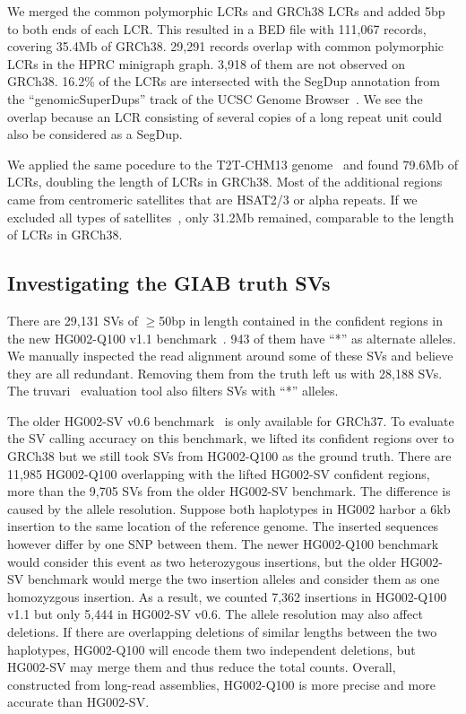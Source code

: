 \documentclass[a4paper,num-refs]{oup-contemporary}
\begin{document}
We merged the common polymorphic LCRs and GRCh38 LCRs and added 5bp to both ends of each LCR.
This resulted in a BED file with 111,067 records, covering 35.4Mb of GRCh38.
29,291 records overlap with common polymorphic LCRs in the HPRC minigraph graph.
3,918 of them are not observed on GRCh38.
16.2\% of the LCRs are intersected with the SegDup annotation from the ``genomicSuperDups'' track of the UCSC Genome Browser~\cite{Perez:2025aa}.
We see the overlap because an LCR consisting of several copies of a long repeat unit could also be considered as a SegDup.

We applied the same pocedure to the T2T-CHM13 genome~\cite{Nurk:2022up}
and found 79.6Mb of LCRs, doubling the length of LCRs in GRCh38.
Most of the additional regions came from centromeric satellites that are HSAT2/3 or alpha repeats.
If we excluded all types of satellites~\cite{Altemose:2022tv}, only 31.2Mb remained,
comparable to the length of LCRs in GRCh38.

\subsection{Investigating the GIAB truth SVs}

There are 29,131 SVs of $\ge$50bp in length contained in the confident regions in the new HG002-Q100 v1.1 benchmark~\cite{Hansen2025.09.21.677443}.
943 of them have ``*'' as alternate alleles.
We manually inspected the read alignment around some of these SVs and believe they are all redundant.
Removing them from the truth left us with 28,188 SVs.
The truvari~\cite{English:2022aa} evaluation tool also filters SVs with ``*'' alleles.

The older HG002-SV v0.6 benchmark~\cite{Zook:2020aa} is only available for GRCh37.
To evaluate the SV calling accuracy on this benchmark,
we lifted its confident regions over to GRCh38
but we still took SVs from HG002-Q100 as the ground truth.
There are 11,985 HG002-Q100 overlapping with the lifted HG002-SV confident regions,
more than the 9,705 SVs from the older HG002-SV benchmark.
The difference is caused by the allele resolution.
Suppose both haplotypes in HG002 harbor a 6kb insertion to the same location of the reference genome.
The inserted sequences however differ by one SNP between them.
The newer HG002-Q100 benchmark
would consider this event as two heterozygous insertions,
but the older HG002-SV benchmark would merge the two insertion alleles and consider them as one homozyzgous insertion.
As a result, we counted 7,362 insertions in HG002-Q100 v1.1 but only 5,444 in HG002-SV v0.6.
The allele resolution may also affect deletions.
If there are overlapping deletions of similar lengths between the two haplotypes,
HG002-Q100 will encode them two independent deletions,
but HG002-SV may merge them and thus reduce the total counts.
Overall, constructed from long-read assemblies, HG002-Q100 is more precise and more accurate than HG002-SV.
\end{document}
